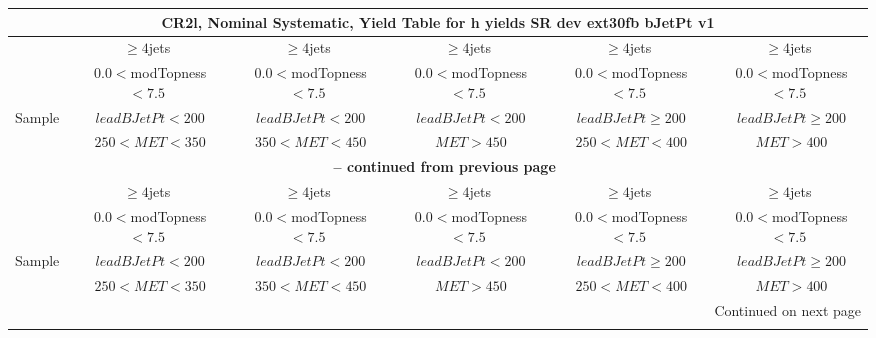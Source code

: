 \documentclass{article}
\begin{document}
\begin{longtable}{|l|c|c|c|c|c|} 
 
\multicolumn{6}{c}{ CR2l, Nominal Systematic, Yield Table for h yields SR dev ext30fb bJetPt v1 }\\* \hline 
  & $\ge4$jets  & $\ge4$jets  & $\ge4$jets  & $\ge4$jets  & $\ge4$jets \\* 
  & ~$0.0<$modTopness$<7.5$  & ~$0.0<$modTopness$<7.5$  & ~$0.0<$modTopness$<7.5$  & ~$0.0<$modTopness$<7.5$  & ~$0.0<$modTopness$<7.5$ \\* 
Sample  & ~$leadBJetPt<200$  & ~$leadBJetPt<200$  & ~$leadBJetPt<200$  & ~$leadBJetPt\ge200$  & ~$leadBJetPt\ge200$ \\* 
  & ~$250<MET<350$  & ~$350<MET<450$  & ~$MET>450$  & ~$250<MET<400$  & ~$MET>400$ \\* 
\hline \hline 
\endfirsthead 
 
\multicolumn{6}{c}{{\bfseries \tablename\ \thetable{} -- continued from previous page}}\\* \hline 
  & $\ge4$jets  & $\ge4$jets  & $\ge4$jets  & $\ge4$jets  & $\ge4$jets \\* 
  & ~$0.0<$modTopness$<7.5$  & ~$0.0<$modTopness$<7.5$  & ~$0.0<$modTopness$<7.5$  & ~$0.0<$modTopness$<7.5$  & ~$0.0<$modTopness$<7.5$ \\* 
Sample  & ~$leadBJetPt<200$  & ~$leadBJetPt<200$  & ~$leadBJetPt<200$  & ~$leadBJetPt\ge200$  & ~$leadBJetPt\ge200$ \\* 
  & ~$250<MET<350$  & ~$350<MET<450$  & ~$MET>450$  & ~$250<MET<400$  & ~$MET>400$ \\* 
\hline \hline 
\endhead 
 
\multicolumn{6}{|r|}{{Continued on next page}}\\* \hline 
\endfoot 
 
 
\endlastfoot 
 

\end{longtable}
\end{document}
